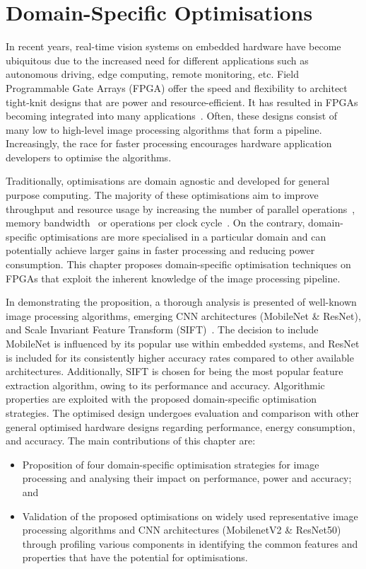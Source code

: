 \chapter{Domain-Specific Optimisations}\label{chap:DSO}
\label{sec1}
In recent years, real-time vision systems on embedded hardware have become ubiquitous due to the increased need for different applications such as autonomous driving, edge computing, remote monitoring, etc. Field Programmable Gate Arrays (FPGA) offer the speed and flexibility to architect tight-knit designs that are power and resource-efficient. It has resulted in FPGAs becoming integrated into many applications~\cite{bhowmik2018embedded}. Often, these designs consist of many low to high-level image processing algorithms that form a pipeline. Increasingly, the race for faster processing encourages hardware application developers to optimise the algorithms. 

Traditionally, optimisations are domain agnostic and developed for general purpose computing. The majority of these optimisations aim to improve throughput and resource usage by increasing the number of parallel operations~\cite{VouKalLy16}, memory bandwidth~\cite{ChaDar14} or operations per clock cycle~\cite{LeyDomGar14}. On the contrary, domain-specific optimisations are more specialised in a particular domain and can potentially achieve larger gains in faster processing and reducing power consumption. This chapter proposes domain-specific optimisation techniques on FPGAs that exploit the inherent knowledge of the image processing pipeline.   
 
In demonstrating the proposition, a thorough analysis is presented of well-known image processing algorithms, emerging CNN architectures (MobileNet\cite{SanMarkHowAnd18} \& ResNet\cite{HeZhaXia16}), and Scale Invariant Feature Transform (SIFT)~\cite{lowe2004distinctive}. The decision to include MobileNet is influenced by its popular use within embedded systems, and ResNet is included for its consistently higher accuracy rates compared to other available architectures. Additionally, SIFT is chosen for being the most popular feature extraction algorithm, owing to its performance and accuracy. Algorithmic properties are exploited with the proposed domain-specific optimisation strategies. The optimised design undergoes evaluation and comparison with other general optimised hardware designs regarding performance, energy consumption, and accuracy. The main contributions of this chapter are:

\begin{itemize}
    \item Proposition of four domain-specific optimisation strategies for image processing and analysing their impact on performance, power and accuracy; and 
    
    \item Validation of the proposed optimisations on widely used representative image processing algorithms and CNN architectures (MobilenetV2 \& ResNet50) through profiling various components in identifying the common features and properties that have the potential for optimisations.
\end{itemize}



